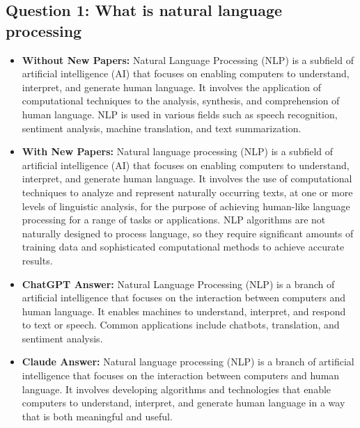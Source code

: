 \documentclass[fleqn,moreauthors,10pt]{ds_report}
\begin{document}
\subsection*{Question 1: What is natural language processing}
\begin{itemize}
  \item \textbf{Without New Papers:} Natural Language Processing (NLP) is a subfield of artificial intelligence (AI) that focuses on enabling computers to understand, interpret, and generate human language. It involves the application of computational techniques to the analysis, synthesis, and comprehension of human language. NLP is used in various fields such as speech recognition, sentiment analysis, machine translation, and text summarization.
  
  \item \textbf{With New Papers:} Natural language processing (NLP) is a subfield of artificial intelligence (AI) that focuses on enabling computers to understand, interpret, and generate human language. It involves the use of computational techniques to analyze and represent naturally occurring texts, at one or more levels of linguistic analysis, for the purpose of achieving human-like language processing for a range of tasks or applications. NLP algorithms are not naturally designed to process language, so they require significant amounts of training data and sophisticated computational methods to achieve accurate results.
  
  \item \textbf{ChatGPT Answer:} Natural Language Processing (NLP) is a branch of artificial intelligence that focuses on the interaction between computers and human language. It enables machines to understand, interpret, and respond to text or speech. Common applications include chatbots, translation, and sentiment analysis.

  \item \textbf{Claude Answer:} Natural language processing (NLP) is a branch of artificial intelligence that focuses on the interaction between computers and human language. It involves developing algorithms and technologies that enable computers to understand, interpret, and generate human language in a way that is both meaningful and useful.
\end{itemize}
\end{document}
